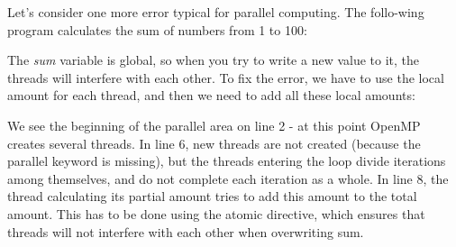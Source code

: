 {	\par Let's consider one more error typical for parallel computing. The follo-wing program calculates the sum of numbers from 1 to 100:
	\begin{figure}[H]
		
	\end{figure}
	\par The \textit{sum} variable is global, so when you try to write a new value to it, the threads will interfere with each other. To fix the error, we have to use the local amount for each thread, and then we need to add all these local amounts:
	\begin{figure}[H]
		
	\end{figure}
	We see the beginning of the parallel area on line 2 -  at this point OpenMP creates several threads. In line 6, new threads are not created (because the parallel keyword is missing), but the threads entering the loop divide iterations among themselves, and do not complete each iteration as a whole. In line 8, the  thread calculating its partial amount tries to add this amount to the total amount. This has to be done using the atomic directive, which ensures that threads will not interfere with each other when overwriting sum.
	
}
